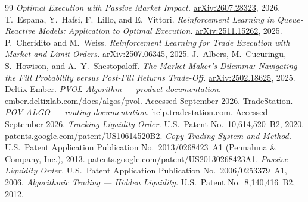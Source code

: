 \documentclass[11pt]{article}
\begin{document}
\begin{thebibliography}{99}
  \emph{Optimal Execution with Passive Market Impact.}
  \href{https://arxiv.org/abs/2607.28323}{arXiv:2607.28323}, 2026.
 T.~Espana, Y.~Hafsi, F.~Lillo, and E.~Vittori.
  \emph{Reinforcement Learning in Queue-Reactive
  Models: Application to Optimal Execution.} \href{https://arxiv.org/abs/2511.15262}{arXiv:2511.15262}, 2025.
 P.~Cheridito and M.~Weiss.
  \emph{Reinforcement Learning for Trade Execution with Market
  and Limit Orders.} \href{https://arxiv.org/abs/2507.06345}{arXiv:2507.06345}, 2025.
 J.~Albers, M.~Cucuringu, S.~Howison, and A.~Y.~Shestopaloff.
  \emph{The Market Maker's Dilemma: Navigating the Fill
  Probability versus Post-Fill Returns Trade-Off.} \href{https://arxiv.org/abs/2502.18625}{arXiv:2502.18625}, 2025.
 Deltix Ember. \emph{PVOL Algorithm --- product documentation.}
  \href{https://ember.deltixlab.com/docs/algos/pvol/}{ember.deltixlab.com/docs/algos/pvol}.
  Accessed September 2026.
 TradeStation. \emph{POV-ALGO --- routing documentation.}
  \href{https://help.tradestation.com/10_00/eng/tradestationhelp/routes/pov-algo.htm}{help.tradestation.com}.
  Accessed September 2026.
 \emph{Tracking Liquidity Order.}
  U.S.\ Patent No.\ 10,614,520~B2, 2020.
  \href{https://patents.google.com/patent/US10614520B2/en}{patents.google.com/patent/US10614520B2}.
 \emph{Copy Trading System and Method.}
  U.S.\ Patent Application Publication No.\ 2013/0268423~A1
  (Pennaluna \& Company, Inc.), 2013.
  \href{https://patents.google.com/patent/US20130268423A1/en}{patents.google.com/patent/US20130268423A1}.
 \emph{Passive Liquidity Order.}
  U.S.\ Patent Application Publication No.\ 2006/0253379~A1, 2006.
 \emph{Algorithmic Trading --- Hidden Liquidity.}
  U.S.\ Patent No.\ 8,140,416~B2, 2012.
\end{thebibliography}
\end{document}
